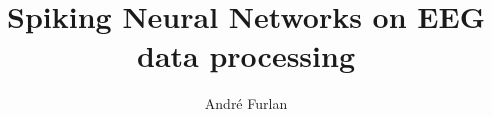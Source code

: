 	\begin{frontmatter}
		\vspace*{-40pt}
		\title{Spiking Neural Networks on EEG data processing}
		\author[a1,a2]{Andr\'{e} Furlan}
		\address[a1]{Instituto de Bioci\^{e}ncias, Letras e Ci\^{e}ncias Exatas, Unesp - Univ Estadual Paulista (S\~{a}o Paulo State University), Rua Crist\'{o}v\~{a}o Colombo 2265, Jd Nazareth, 15054-000, S\~{a}o Jos\'{e} do Rio Preto - SP, Brazil.}
		\address[a2]{Centro Paula Souza, S\~{a}o Paulo, SP, Brazil.}
		\begin{abstract} 
			
		\end{abstract}
		\begin{keyword}
			
		\end{keyword}
	\end{frontmatter}